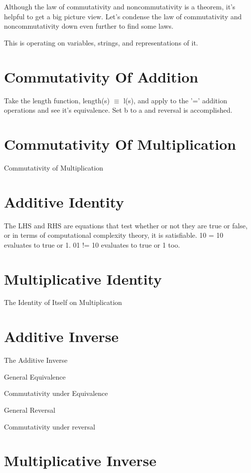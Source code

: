 Although the law of commutativity and noncommutativity is a theorem, it's helpful to get a big picture view. Let's condense the law of commutativity and noncommutativity down even further to find some laws.

This is operating on variables, strings, and representations of it.

\section{Commutativity Of Addition}

Take the length function, length(s) $\equiv$ l(s), and apply to the '=' addition operations and see it's equivalence. Set b to a and reversal is accomplished.

\section{Commutativity Of Multiplication}

Commutativity of Multiplication

\section{Additive Identity}

The LHS and RHS are equations that test whether or not they are true or false, or in terms of computational complexity theory, it is satisfiable.
10 = 10 evaluates to true or 1.
01 != 10 evaluates to true or 1 too.

\section{Multiplicative Identity}

The Identity of Itself on Multiplication

\section{Additive Inverse}

The Additive Inverse

General Equivalence

Commutativity under Equivalence

General Reversal

Commutativity under reversal

\section{Multiplicative Inverse}

